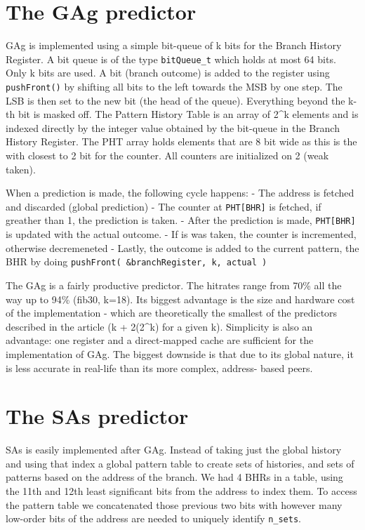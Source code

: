 \documentclass[a4paper]{article}
\begin{document}
\section{The GAg predictor%
  \label{the-gag-predictor}%
}

GAg is implemented using a simple bit-queue of k bits for the Branch History Register.
A bit queue is of the type \texttt{bitQueue\_t} which holds at most 64 bits.
Only k bits are used. A bit (branch outcome) is added to the register
using \texttt{pushFront()} by shifting all bits to the left towards the MSB by one step.
The LSB is then set to the new bit (the head of the queue).
Everything beyond the k-th bit is masked off.
The Pattern History Table is an array of 2\textasciicircum{}k elements and is indexed directly
by the integer value obtained by the bit-queue in the Branch History Register.
The PHT array holds elements that are 8 bit wide as this is the with closest to
2 bit for the counter. All counters are initialized on 2 (weak taken).

When a prediction is made, the following cycle happens:
- The address is fetched and discarded (global prediction)
- The counter at \texttt{PHT{[}BHR{]}} is fetched, if greather than 1, the prediction is
taken.
- After the prediction is made, \texttt{PHT{[}BHR{]}} is updated with the actual outcome.
- If is was taken, the counter is incremented, otherwise decremeneted
- Lastly, the outcome is added to the current pattern, the BHR by doing
\texttt{pushFront( \&branchRegister, k, actual )}

The GAg is a fairly productive predictor. The hitrates range from 70\% all the
way up to 94\% (fib30, k=18). Its biggest advantage is the size and hardware cost
of the implementation - which are theoretically the smallest of the predictors
described in the article (k + 2(2\textasciicircum{}k) for a given k).
Simplicity is also an advantage: one register and a direct-mapped cache are
sufficient for the implementation of GAg. The biggest downside is that due to
its global nature, it is less accurate in real-life than its more complex, address-
based peers.


\section{The SAs predictor%
  \label{the-sas-predictor}%
}

SAs is easily implemented after GAg. Instead of taking just the global history and using that index
a global pattern table to create sets of histories, and sets of patterns based on the address of
the branch. We had 4 BHRs in a table, using the 11th and 12th least significant bits from the
address to index them. To access the pattern table we concatenated those previous two bits with
however many low-order bits of the address are needed to uniquely identify \texttt{n\_sets}.
\end{document}
